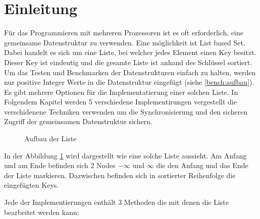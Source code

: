 \documentclass[10pt,a4paper,titlepage,oneside]{article}
\begin{document}
 

\maketitle  
 
\tableofcontents
\newpage  
\section{Einleitung}
Für das Programmieren mit mehreren Prozessoren ist es oft erforderlich, eine gemeinsame Datenstruktur zu verwenden. 
Eine möglichkeit ist List based Set. Dabei handelt es sich um eine Liste, bei welcher jedes Element einen Key besitzt.
Dieser Key ist eindeutig und die gesamte Liste ist anhand des Schlüssel sortiert. 
Um das Testen und Benchmarken der Datenstrukturen einfach zu halten, werden nur positive Integer Werte in die Datenstruktur eingefügt (siehe \ref{bench:aufbau}). Es gibt mehrere Optionen für die Implementatierung einer solchen Liste. In Folgendem Kapitel werden 5 verschiedene Implementirungen vergestellt die verschidenene Techniken verwenden um die Synchronisierung und den sicheren Zugriff der gemeinsamen Datenstruktur sichern.

\begin{figure}[H]
	\centering 
	\caption{Aufbau der Liste}
	\label{tik:list}
\end{figure}

In der Abbildung \ref{tik:list} wird dargestellt wie eine solche Liste aussieht. Am Anfang und am Ende befinden sich 2 Nodes $-\infty$ und $\infty$ die den Anfang und das Ende der Liste markieren. Dazwischen befinden sich in sortierter Reihenfolge die eingefügten Keys.

Jede der Implementierungen enthält 3 Methoden die mit denen die Liste bearbeitet werden kann:
\end{document}
